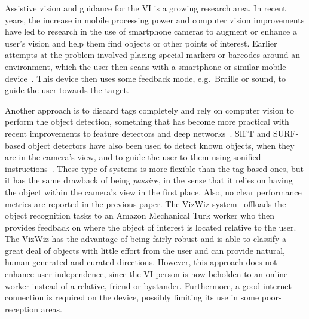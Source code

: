 \documentclass[a4paper, twoside]{article}
\begin{document}
\noindent Assistive vision and guidance for the VI is a growing research area. In recent years, the increase in mobile processing power and computer vision improvements have led to research in the use of smartphone cameras to augment or enhance a user's vision and help them find objects or other points of interest. Earlier attempts at the problem involved placing special markers or barcodes around an environment, which the user then scans with a smartphone or similar mobile device~\cite{gude2013blind,iannizzotto2005badge3d,manduchi2012mobile}. This device then uses some feedback mode, e.g.\ Braille or sound, to guide the user towards the target. %

Another approach is to discard tags completely and rely on computer vision to perform the object detection, something that has become more practical with recent improvements to feature detectors and deep networks~\cite{huang2017speed,redmon2016you}. SIFT and SURF-based object detectors have also been used to detect known objects, when they are in the camera's view, and to guide the user to them using sonified instructions~\cite{schauerte2012assistive}. These type of systems is more flexible than the tag-based ones, but it has the same drawback of being {\em passive}, in the sense that it relies on having the object within the camera's view in the first place. Also, no clear performance metrics are reported in the previous paper. The VizWiz system~\cite{bigham2010vizwiz} offloads the object recognition tasks to an Amazon Mechanical Turk worker who then provides feedback on where the object of interest is located relative to the user. The VizWiz has the advantage of being fairly robust and is able to classify a great deal of objects with little effort from the user and can provide natural, human-generated and curated directions. However, this approach does not enhance user independence, since the VI person is now beholden to an online worker instead of a relative, friend or bystander. Furthermore, a good internet connection is required on the device, possibly limiting its use in some poor-reception areas.
\end{document}
